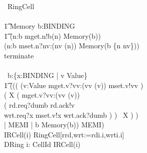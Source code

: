 \documentclass[10pt]{article}
\begin{document}
\begin{circus}
    \circprocess\ RingCell \circdef \\
    \circbegin\\
    \t1
        Memory \circdef 
            \circvres b:BINDING \circspot \\
            \t1
                (\Extchoice n:\dom b \circspot mget.n!b(n) \then Memory(b)) \\
                \extchoice (\Extchoice n:\dom b \circspot mset.n?nv:(nv \in \delta(n)) \then Memory(b \oplus \{n \mapsto nv\}))\\
                \extchoice terminate \then \Skip \\
        \\
        \circspot
            \circvar\ b:\{x:BINDING | v \in Value\} \circspot \\
            \t1
            ((( 
                        (\Intchoice v:Value \circspot mget.v?vv:(vv \in \delta(v)) \then mset.v!vv \then \Skip) \circseq \\
                            ( \circmu X \circspot
                                ( mget.v?vv:(vv \in \delta(v)) \then \\
                                    ( rd.req?dumb \then rd.ack!v \then \Skip \\
                                      \extchoice wrt.req?x \then mset.v!x 
                                                \then wrt.ack?dumb \then \Skip
                                    )
                                ) \circseq\ X
                            )
                        ) \\
                        \lpar {} | MEMI | { b } \rpar Memory(b))
                        \circhide MEMI)
    \circend
    \\
    \circprocess IRCell(i) \circdef RingCell[rrd,wrt:=rdi.i,wrti.i]
    \\
    \circprocess DRing \circdef \Interleave i: CellId \circspot IRCell(i)
\end{circus}%
\end{document}
